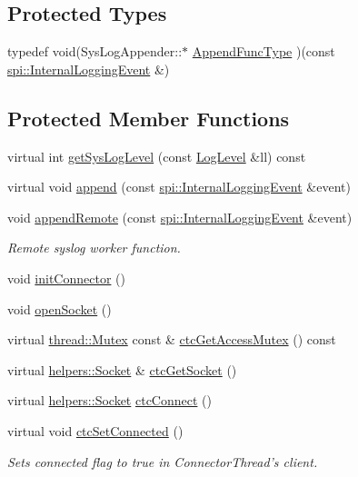 \subsection*{Protected Types}
\begin{DoxyCompactItemize}
\item 
typedef void(Sys\-Log\-Appender\-::$\ast$ \hyperlink{classlog4cplus_1_1SysLogAppender_a60a3cdf1a9574897b146a9349f0016ab}{Append\-Func\-Type} )(const \hyperlink{classlog4cplus_1_1spi_1_1InternalLoggingEvent}{spi\-::\-Internal\-Logging\-Event} \&)
\end{DoxyCompactItemize}
\subsection*{Protected Member Functions}
\begin{DoxyCompactItemize}
\item 
virtual int \hyperlink{classlog4cplus_1_1SysLogAppender_a7ab6eb66ea68598e0c52881167d2cd09}{get\-Sys\-Log\-Level} (const \hyperlink{namespacelog4cplus_abd332cc8c98fefcbbdcf57b6b3867de9}{Log\-Level} \&ll) const 
\item 
virtual void \hyperlink{classlog4cplus_1_1SysLogAppender_ae2634d44e5cb8765881197e58b536570}{append} (const \hyperlink{classlog4cplus_1_1spi_1_1InternalLoggingEvent}{spi\-::\-Internal\-Logging\-Event} \&event)
\item 
void \hyperlink{classlog4cplus_1_1SysLogAppender_a3a62f726deb916afc59eec2319c22875}{append\-Remote} (const \hyperlink{classlog4cplus_1_1spi_1_1InternalLoggingEvent}{spi\-::\-Internal\-Logging\-Event} \&event)
\begin{DoxyCompactList}\small\item\em Remote syslog worker function. \end{DoxyCompactList}\item 
void \hyperlink{classlog4cplus_1_1SysLogAppender_a20d68edeb3fdd723931149c662368d1d}{init\-Connector} ()
\item 
void \hyperlink{classlog4cplus_1_1SysLogAppender_abef34f9c4932a059ab2be442b774ae1a}{open\-Socket} ()
\item 
virtual \hyperlink{classlog4cplus_1_1thread_1_1Mutex}{thread\-::\-Mutex} const \& \hyperlink{classlog4cplus_1_1SysLogAppender_a2272bea40df278561867275361fad002}{ctc\-Get\-Access\-Mutex} () const 
\item 
virtual \hyperlink{classlog4cplus_1_1helpers_1_1Socket}{helpers\-::\-Socket} \& \hyperlink{classlog4cplus_1_1SysLogAppender_af24dba6dd50e4380e8846a53fa9ecac8}{ctc\-Get\-Socket} ()
\item 
virtual \hyperlink{classlog4cplus_1_1helpers_1_1Socket}{helpers\-::\-Socket} \hyperlink{classlog4cplus_1_1SysLogAppender_a89d7f6aa0a0d939d76696d6a57965f4f}{ctc\-Connect} ()
\item 
virtual void \hyperlink{classlog4cplus_1_1SysLogAppender_a07d0db02cc101a9eaeaf82a2ef0848d1}{ctc\-Set\-Connected} ()
\begin{DoxyCompactList}\small\item\em Sets connected flag to true in Connector\-Thread's client. \end{DoxyCompactList}\end{DoxyCompactItemize}
